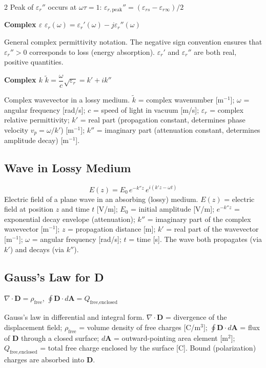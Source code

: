 \documentclass[9pt]{extarticle}
\newcommand{\eqlabel}[1]{\textbf{\scriptsize #1}\;}
\newcommand{\desc}[1]{{\small\color{desc}#1}}
\begin{document}
\begin{multicols}{2}
\desc{Peak of $\varepsilon_r''$ occurs at $\omega\tau = 1$: \; $\varepsilon_{r,\text{peak}}'' = (\varepsilon_{rs}-\varepsilon_{r\infty})/2$}

\eqlabel{Complex $\varepsilon$} $\varepsilon_r(\omega) = \varepsilon_r'(\omega) - j\varepsilon_r''(\omega)$

\desc{General complex permittivity notation. The negative sign convention ensures that $\varepsilon_r'' > 0$ corresponds to loss (energy absorption). $\varepsilon_r'$ and $\varepsilon_r''$ are both real, positive quantities.}

\eqlabel{Complex $k$} $\tilde{k} = \dfrac{\omega}{c}\sqrt{\varepsilon_r} = k' + ik''$

\desc{Complex wavevector in a lossy medium. $\tilde{k}$ = complex wavenumber [m$^{-1}$]; $\omega$ = angular frequency [rad/s]; $c$ = speed of light in vacuum [m/s]; $\varepsilon_r$ = complex relative permittivity; $k'$ = real part (propagation constant, determines phase velocity $v_p = \omega/k'$) [m$^{-1}$]; $k''$ = imaginary part (attenuation constant, determines amplitude decay) [m$^{-1}$].}

\subsection{Wave in Lossy Medium}
\[E(z) = E_0\,e^{-k''z}\,e^{i(k'z-\omega t)}\]
\desc{Electric field of a plane wave in an absorbing (lossy) medium. $E(z)$ = electric field at position $z$ and time $t$ [V/m]; $E_0$ = initial amplitude [V/m]; $e^{-k''z}$ = exponential decay envelope (attenuation); $k''$ = imaginary part of the complex wavevector [m$^{-1}$]; $z$ = propagation distance [m]; $k'$ = real part of the wavevector [m$^{-1}$]; $\omega$ = angular frequency [rad/s]; $t$ = time [s]. The wave both propagates (via $k'$) and decays (via $k''$).}

\subsection{Gauss's Law for D}
$\nabla\cdot\mathbf{D} = \rho_{\text{free}}$, \quad $\displaystyle\oint\mathbf{D}\cdot d\mathbf{A} = Q_{\text{free,enclosed}}$

\desc{Gauss's law in differential and integral form. $\nabla\cdot\mathbf{D}$ = divergence of the displacement field; $\rho_{\text{free}}$ = volume density of free charges [C/m$^3$]; $\oint\mathbf{D}\cdot d\mathbf{A}$ = flux of $\mathbf{D}$ through a closed surface; $d\mathbf{A}$ = outward-pointing area element [m$^2$]; $Q_{\text{free,enclosed}}$ = total free charge enclosed by the surface [C]. Bound (polarization) charges are absorbed into $\mathbf{D}$.}


\end{multicols}
\end{document}
